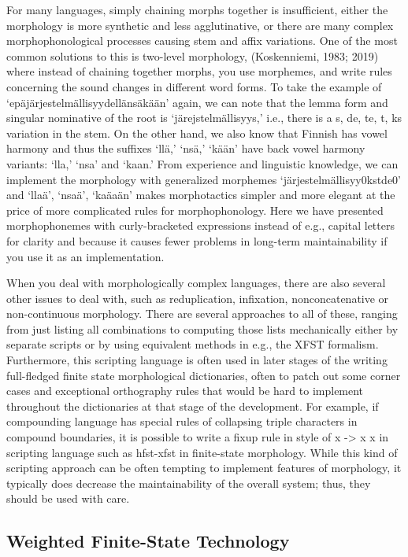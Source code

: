 \documentclass[free]{flammie}
\begin{document}
For many languages, simply chaining morphs together is insufficient, either the
morphology is more synthetic and less agglutinative, or there are many complex
morphophonological processes causing stem and affix variations. One of the most common
solutions to this is two-level morphology, (Koskenniemi, 1983; 2019) where instead of
chaining together morphs, you use morphemes, and write rules concerning the sound
changes in different word forms. To take the example of
‘epäjärjestelmällisyydellänsäkään’ again, we can note that the lemma form and singular
nominative of the root is ‘järejstelmällisyys,’ i.e., there is a {s, de, te, t, ks} variation in the
stem. On the other hand, we also know that Finnish has vowel harmony and thus the
suffixes ‘llä,’ ‘nsä,’ ‘kään’ have back vowel harmony variants: ‘lla,’ ‘nsa’ and ‘kaan.’
From experience and linguistic knowledge, we can implement the morphology with
generalized morphemes ‘järjestelmällisyy{0k}{std}{e0}’ and ‘ll{aä}’, ‘ns{aä}’,
‘k{aä}{aä}n’ makes morphotactics simpler and more elegant at the price of more
complicated rules for morphophonology. Here we have presented morphophonemes with
curly-bracketed expressions instead of e.g., capital letters for clarity and because it causes
fewer problems in long-term maintainability if you use it as an implementation.

When you deal with morphologically complex languages, there are also several other
issues to deal with, such as reduplication, infixation, nonconcatenative or non-continuous
morphology. There are several approaches to all of these, ranging from just listing all
combinations to computing those lists mechanically either by separate scripts or by using
equivalent methods in e.g., the XFST formalism. Furthermore, this scripting language is
often used in later stages of the writing full-fledged finite state morphological dictionaries,
often to patch out some corner cases and exceptional orthography rules that would be hard
to implement throughout the dictionaries at that stage of the development. For example, if
compounding language has special rules of collapsing triple characters in compound
boundaries, it is possible to write a fixup rule in style of x -> x x in scripting language
such as hfst-xfst in finite-state morphology. While this kind of scripting approach
can be often tempting to implement features of morphology, it typically does decrease the
maintainability of the overall system; thus, they should be used with care.

\subsection{Weighted Finite-State Technology}
\end{document}
